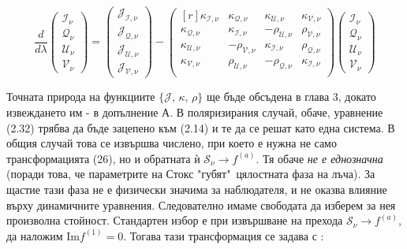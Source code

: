 \begin{equation}
	\frac{d}{d\lambda} \begin{pmatrix}
							\mathcal{I}_\nu\\
							\mathcal{Q}_\nu\\
							\mathcal{U}_\nu\\
							\mathcal{V}_\nu
					     \end{pmatrix} = 
					     \begin{pmatrix}
					     	\mathcal{J}_\mathcal{I,\nu}\\
					     	\mathcal{J}_\mathcal{Q,\nu}\\
					     	\mathcal{J}_\mathcal{U,\nu}\\
					     	\mathcal{J}_\mathcal{V,\nu}
					     \end{pmatrix}
					     -	\begin{pmatrix*}[r]
					     	\kappa_\mathcal{I,\nu} & \kappa_\mathcal{Q,\nu} & \kappa_\mathcal{U,\nu} & \kappa_\mathcal{V,\nu}\\
					        \kappa_\mathcal{Q,\nu}& \kappa_\mathcal{I,\nu}& -\rho_\mathcal{U,\nu}& \rho_\mathcal{V,\nu}\\     	
					     	\kappa_\mathcal{U,\nu}& -\rho_\mathcal{V,\nu}& \kappa_\mathcal{I,\nu}& \rho_\mathcal{Q,\nu}\\	  
					     	 \kappa_\mathcal{V,\nu}& \rho_\mathcal{U,\nu}& -\rho_\mathcal{Q,\nu}& \kappa_\mathcal{I,\nu}\\
					     	\end{pmatrix*}
					     	\begin{pmatrix}
					     		\mathcal{I}_\nu\\
					     		\mathcal{Q}_\nu\\
					     		\mathcal{U}_\nu\\
					     		\mathcal{V}_\nu
					     	\end{pmatrix}
\end{equation}

\noindent Точната природа на функциите $\{\mathcal{J},\,\mathcal{\kappa},\,\mathcal{\rho}\}$ ще бъде обсъдена в глава 3, докато извеждането им - в допълнение А. В поляризирания случай, обаче, уравнение (2.32) трябва да бъде зацепено към (2.14) и те да се решат като една система. В общия случай това се извършва числено, при което е нужна не само трансформацията (26), но и обратната ѝ $\mathcal{S}_\nu\rightarrow f^{(a)}$. Тя обаче \emph{не е еднозначна} (поради това, че параметрите на Стокс "губят"$\,$ цялостната фаза на лъча). За щастие тази фаза не е физически значима за наблюдателя, и не оказва влияние върху динамичните уравнения. Следователно имаме свободата да изберем за нея произволна стойност. Стандартен избор е при извършване на прехода $\mathcal{S}_\nu\rightarrow f^{(a)}$, да наложим $\text{Im}{f^{(1)}} = 0$. Тогава тази трансформация се задава с \cite{Bronzwaer2020}:

